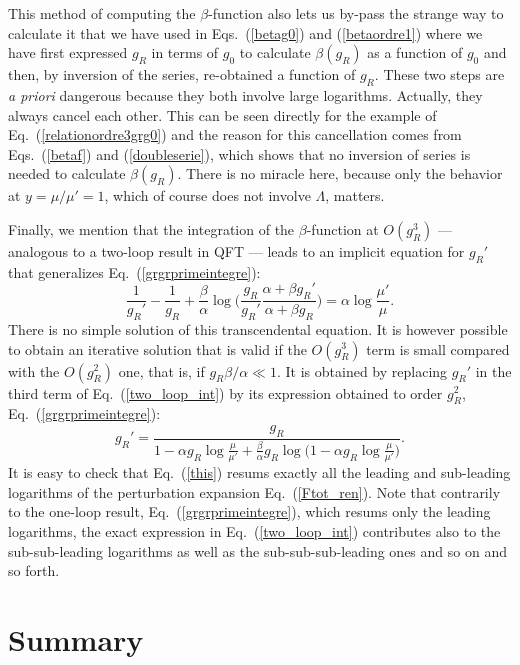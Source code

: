\documentclass[floatfix,twocolumn,preprintnumbers,amsmath,amssymb,prb]{revtex4}
\begin{document}
{This method of computing the $\beta$-function also lets us by-pass
the strange way to calculate it that we have used in
Eqs.~(\ref{betag0}) and (\ref{betaordre1}) where we have first
expressed $g_R$ in terms of $g_0$ to calculate $\beta(g_R)$ as a
function of $g_0$ and then, by inversion of the series,
re-obtained a function of $g_R$. These two steps are {\em a
priori} dangerous because they both involve large logarithms.
Actually, they always cancel each other. This can be seen directly
for the example of Eq.~(\ref{relationordre3grg0}) and the 
reason for this cancellation comes from Eqs.~(\ref{betaf}) and
(\ref{doubleserie}), which shows that no inversion of series is
needed to calculate $\beta(g_R)$. There is no miracle here,
because only the behavior at
$y=\mu/\mu'=1$, which of course does not involve $\Lambda$,
matters.

Finally, we mention that the integration of the $\beta$-function at
$O(g_R^3)$ --- analogous to a two-loop result in QFT --- leads to
an implicit equation for $g_R'$ that generalizes
Eq.~(\ref{grgrprimeintegre}):
\begin{equation}
\frac{1}{g_R'}- \frac{1}{g_R} +\frac{\beta}{\alpha}
\log\big(\frac{g_R}{g_R'} \frac{\alpha +\beta g_R'}{\alpha +\beta
g_R} \big)=
\alpha\log\frac{\mu'}{\mu}.
\label{two_loop_int}
\end{equation}
There is no simple solution of this transcendental equation. It is
however possible to obtain an iterative solution that is valid if
the $O(g_R^3)$ term is small compared with the
$O(g_R^2)$ one, that is, if $g_R \beta/\alpha\ll 1$. It is
obtained by replacing $g_R'$ in the third term of
Eq.~(\ref{two_loop_int}) by its expression obtained to order
$g_R^2$, Eq.~(\ref{grgrprimeintegre}):
\begin{equation}
g_R'= \frac{g_R}{1-\alpha g_R \log\frac{\mu}{\mu'}
+\frac{\beta}{\alpha} g_R\log\big(1-\alpha g_R
\log\frac{\mu}{\mu'} \big)}.
\label{this}
\end{equation}
It is easy to check that Eq.~(\ref{this}) resums exactly all the
leading and sub-leading logarithms of the perturbation expansion
Eq.~(\ref{Ftot_ren}). Note that contrarily to the one-loop
result, Eq.~(\ref{grgrprimeintegre}), which resums only the
leading logarithms, the exact expression
in Eq.~(\ref{two_loop_int}) contributes also to the sub-sub-leading
logarithms as well as the sub-sub-sub-leading ones and so on and
so forth.

\section{Summary}

}
\end{document}
